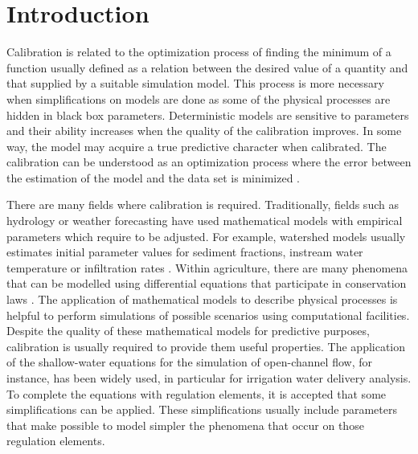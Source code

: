 \documentclass[review,authoryear]{elsarticle}
\begin{document}
\maketitle

\section{Introduction}

Calibration is related to the optimization process of finding the minimum of a
function usually defined as a relation between the desired value of a quantity
and that supplied by a suitable simulation model. This process is more necessary
when simplifications on models are done as some of the
physical processes are hidden in black box parameters. Deterministic models are
sensitive to parameters and their ability increases when the quality of the
calibration improves. In some way, the model may acquire a true predictive
character when calibrated. The calibration can be understood as an optimization
process where the error between the estimation of the model and the data set is
minimized \citep{Lacasta15}.

There are many fields where calibration is required. Traditionally, fields such
as hydrology or weather forecasting have used mathematical models with empirical
parameters which require to be adjusted. For example, watershed models usually
estimates initial parameter values for sediment fractions, instream water
temperature or infiltration rates \citep{Duan04}. Within agriculture, there are
many phenomena that can be modelled using differential equations that
participate in conservation laws
\citep{Playan06,JaviSurcos2,Ebrahimiam13,Ouazaa14,Ouazaa15}. The application of
mathematical models to describe physical processes is helpful to perform
simulations of possible scenarios using computational facilities. Despite the
quality of these mathematical models for predictive purposes, calibration is
usually required to provide them useful properties. The application of the
shallow-water equations for the simulation of open-channel flow, for instance,
has been widely used, in particular for irrigation water delivery analysis. To
complete the equations with regulation elements, it is accepted that some
simplifications can be applied. These simplifications usually include parameters
that make possible to model simpler the phenomena that occur on those regulation
elements.
\end{document}
